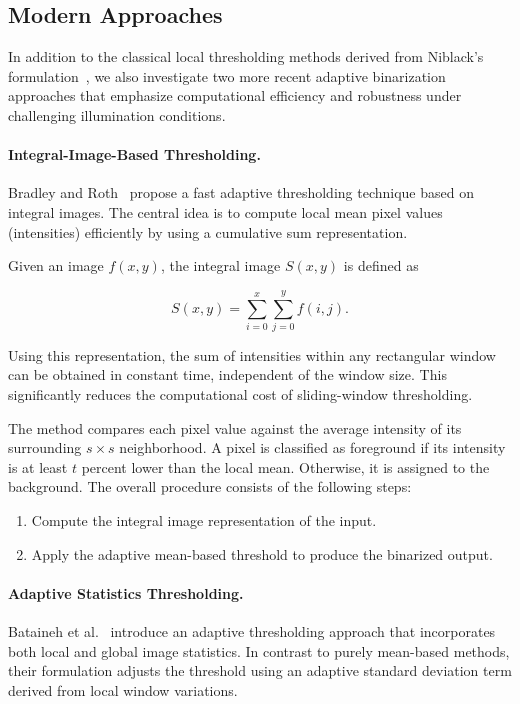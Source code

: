 \subsection{Modern Approaches}\label{subsec:modern}

In addition to the classical local thresholding methods derived from Niblack's formulation~\cite{Niblack1985}, we also investigate two more recent adaptive binarization approaches that emphasize computational efficiency and robustness under challenging illumination conditions.

\paragraph{Integral-Image-Based Thresholding.}
Bradley and Roth~\cite{Bradley2007} propose a fast adaptive thresholding technique based on integral images.
The central idea is to compute local mean pixel values (intensities) efficiently by using a cumulative sum representation.

Given an image $f(x,y)$, the integral image $S(x,y)$ is defined as 

\begin{equation}
  S(x,y) = \sum_{i=0}^{x} \sum_{j=0}^{y} f(i,j).
\end{equation}

Using this representation, the sum of intensities within any rectangular window can be obtained in constant time, independent of the window size.
This significantly reduces the computational cost of sliding-window thresholding.

The method compares each pixel value against the average intensity of its surrounding $s \times s$ neighborhood.
A pixel is classified as foreground if its intensity is at least $t$ percent lower than the local mean.
Otherwise, it is assigned to the background.
The overall procedure consists of the following steps:

\begin{enumerate}
  \item Compute the integral image representation of the input.
  \item Apply the adaptive mean-based threshold to produce the binarized output.
\end{enumerate}

\paragraph{Adaptive Statistics Thresholding.}
Bataineh et al.~\cite{Bataineh2011} introduce an adaptive thresholding approach that incorporates both local and global image statistics. 
In contrast to purely mean-based methods, their formulation adjusts the threshold using an adaptive standard deviation term derived from local window variations.

